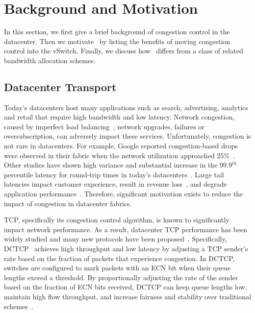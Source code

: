 \section{Background and Motivation}
\label{background}
In this section, we first give a brief background of congestion 
control in the datacenter. Then we motivate~\acdc{} by listing the benefits of moving congestion
control into the vSwitch. Finally, we discuss how~\acdc{} differs from a class of related bandwidth
allocation schemes.

\subsection{Datacenter Transport}
\label{ss:dct}
Today's datacenters host many applications such as search,
advertising, analytics and retail that require high bandwidth and low latency.
Network congestion, caused by imperfect load balancing~\cite{al2010hedera},
network upgrades, failures or oversubscription, can adversely impact these services. Unfortunately, congestion is
not rare in datacenters. For example, Google reported 
congestion-based drops were observed in their fabric when the network utilization approached 25\%~\cite{singh2015jupiter}.
Other studies have shown high variance and substantial increase in the 99.9$^{th}$ percentile latency
for round-trip times in today's datacenters~\cite{wang2010impact,mogul2015inferring}. 
Large tail latencies impact customer experience, result in
revenue loss~\cite{alizadeh2011data,dean2013tail}, and degrade application performance~\cite{jang2015silo,qjump}.
Therefore, significant motivation exists to reduce the impact of congestion in datacenter fabrics.

TCP, specifically its congestion control algorithm, is
known to significantly impact network performance.
As a result, datacenter TCP performance has been widely
studied and many new protocols have been proposed~\cite{alizadeh2011data, stephens2014practical, wu2010ictcp,
mittal2015timely, jose2015high}. Specifically, DCTCP~\cite{alizadeh2011data} achieves high throughput and low
latency by adjusting a TCP sender's rate based on the fraction of packets that experience congestion. In DCTCP,
switches are configured to mark packets with an ECN bit when their queue lengths exceed a threshold. By proportionally
adjusting the rate of the sender based on the fraction of ECN bits received, DCTCP can keep queue lengths low, 
maintain high flow throughput, and increase fairness and stability over traditional schemes~\cite{alizadeh2011data,judd2015nsdi}.


